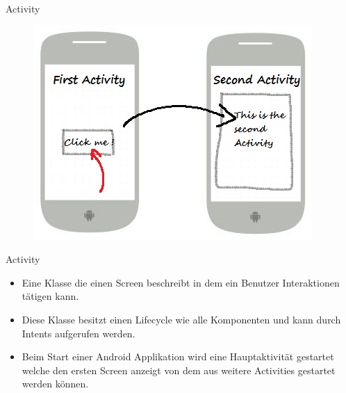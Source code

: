 \documentclass{beamer}
\begin{document}
\begin{frame}{Activity}
\begin{figure}[hb]
 \centering
 \includegraphics[scale=0.7]{android-activity}
\end{figure}
\end{frame}


\begin{frame}{Activity}
\begin{itemize}
\item Eine Klasse die einen Screen beschreibt in dem ein Benutzer Interaktionen tätigen kann.
\item Diese Klasse besitzt einen Lifecycle wie alle Komponenten und kann durch Intents aufgerufen werden.
\item Beim Start einer Android Applikation wird eine Hauptaktivität gestartet welche den ersten Screen anzeigt von dem aus weitere Activities gestartet werden können.
\end{itemize}
\end{frame}
\end{document}
